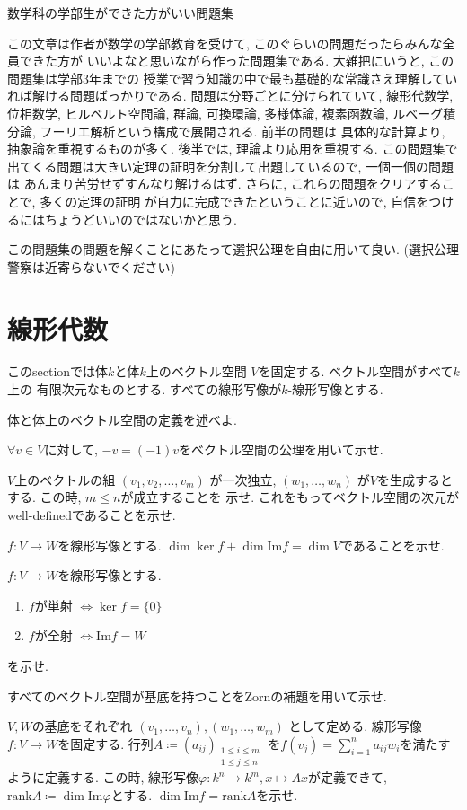 \documentclass[lualatex]{exam}
\theoremstyle{remark}
\theoremstyle{plain}
\newcommand{\jtoday}{\number \year 年 \number \month 月 \number \day 日}
\begin{document}
\centerline{\Large 数学科の学部生ができた方がいい問題集 }
\rightline{\jtoday}
\tableofcontents
この文章は作者が数学の学部教育を受けて, このぐらいの問題だったらみんな全員できた方が
いいよなと思いながら作った問題集である. 大雑把にいうと, この問題集は学部3年までの
授業で習う知識の中で最も基礎的な常識さえ理解していれば解ける問題ばっかりである.
問題は分野ごとに分けられていて, 線形代数学, 位相数学, ヒルベルト空間論, 群論, 可換環論, 多様体論, 
複素函数論, ルベーグ積分論, フーリエ解析という構成で展開される. 前半の問題は
具体的な計算より, 抽象論を重視するものが多く.
後半では, 理論より応用を重視する. 
この問題集で出てくる問題は大きい定理の証明を分割して出題しているので, 
一個一個の問題は
あんまり苦労せずすんなり解けるはず. 
さらに, これらの問題をクリアすることで, 
多くの定理の証明
が自力に完成できたということに近いので, 
自信をつけるにはちょうどいいのではないかと思う. 

この問題集の問題を解くことにあたって選択公理を自由に用いて良い. (選択公理警察は近寄らないでください)
\section{線形代数}
このsectionでは体$k$と体$k$上のベクトル空間 $V$を固定する. ベクトル空間がすべて$k$上の
有限次元なものとする. すべての線形写像が$k$-線形写像とする. 
\begin{questions}

  \question 体と体上のベクトル空間の定義を述べよ.

  \question $\forall v \in V$に対して, $-v = (-1)v$をベクトル空間の公理を用いて示せ.
  
  \question $V$上のベクトルの組 $\left( v_1, v_2, \ldots, v_m \right) $ が一次独立, 
  $\left( w_1, \ldots ,w_n \right) $ が$V$を生成するとする. この時,  $m \leq n$が成立することを
  示せ. これをもってベクトル空間の次元がwell-definedであることを示せ.
  
  \question $f:V \to W$を線形写像とする. $\dim \ker f + \dim \mathrm{Im} f= \dim V$であることを示せ. 
  
  \question $f:V\to W$を線形写像とする. 
   \begin{enumerate}
    \item $f$が単射 $\iff \ker f = \{0\} $ 
    \item $f$が全射 $\iff \mathrm{Im}f =W$
  \end{enumerate}
  を示せ. 
  
  \question すべてのベクトル空間が基底を持つことをZornの補題を用いて示せ.
  
  \question $V,W$の基底をそれぞれ $\left( v_1,\ldots,v_n \right), \left( w_1, \ldots ,w_m \right)  $ として定める. 
  線形写像$f:V \to W$を固定する. 行列$A \coloneqq \left( a_{ij} \right)_{\substack{1\leq i \leq m \\  1 \leq j \leq n}} $ を$f(v_j) = \sum_{i=1}^{n} a_{ij} w_i$を満たすように定義する. 
  この時, 線形写像$\varphi : k^n \to k^m, x \mapsto Ax $が定義できて, $\mathrm{rank} A \coloneqq \dim \mathrm{Im}\varphi  $とする. 
  $\dim \mathrm{Im}f = \mathrm{rank}A$を示せ.
\end{questions}
\end{document}

